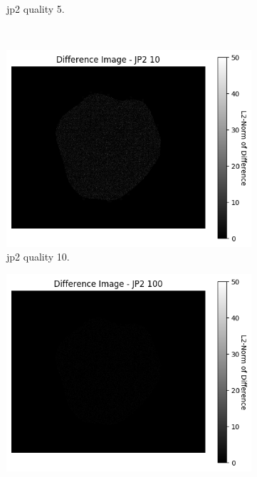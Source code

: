 \begin{figure}[htb]
\begin{subfigure}[b]{0.49\textwidth}
            \caption{\gls{jp2} quality 5.}
            \label{fig:img_quality_heatmap_5}
        \end{subfigure}
        \\
        \begin{subfigure}[b]{0.49\textwidth}
            \centering
            \includegraphics[width=\textwidth]{doc/thesis/0_figures/compare_quality/set1/jp2_10_diff_heatmap.png}
            \caption{\gls{jp2} quality 10.}
            \label{fig:img_quality_heatmap_10}
        \end{subfigure}
        \begin{subfigure}[b]{0.49\textwidth}
            \centering
            \includegraphics[width=\textwidth]{doc/thesis/0_figures/compare_quality/set1/jp2_100_diff_heatmap.png}

\end{subfigure}
\end{figure}
